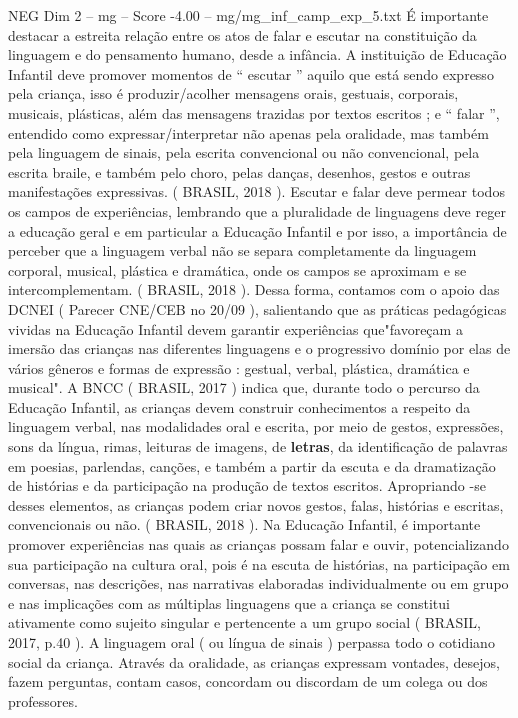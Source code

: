 \begin{textsample}{NEG Dim 2 – mg – Score -4.00 – mg/mg\_inf\_camp\_exp\_5.txt}
É importante destacar a estreita relação entre os atos de falar e escutar na constituição da linguagem e do pensamento humano, desde a infância.
A instituição de Educação Infantil deve promover momentos de “ escutar ” aquilo que está sendo expresso pela criança, isso é produzir/acolher mensagens orais, gestuais, corporais, musicais, plásticas, além das mensagens trazidas por textos escritos ; e “ falar ”, entendido como expressar/interpretar não apenas pela oralidade, mas também pela linguagem de sinais, pela escrita convencional ou não convencional, pela escrita braile, e também pelo choro, pelas danças, desenhos, gestos e outras manifestações expressivas. ( BRASIL, 2018 ).
Escutar e falar deve permear todos os campos de experiências, lembrando que a pluralidade de linguagens deve reger a educação geral e em particular a Educação Infantil e por isso, a importância de perceber que a linguagem verbal não se separa completamente da linguagem corporal, musical, plástica e dramática, onde os campos se aproximam e se intercomplementam. ( BRASIL, 2018 ).
Dessa forma, contamos com o apoio das DCNEI ( Parecer CNE/CEB no 20/09 ), salientando que as práticas pedagógicas vividas na Educação Infantil devem garantir experiências que"favoreçam a imersão das crianças nas diferentes linguagens e o progressivo domínio por elas de vários gêneros e formas de expressão : gestual, verbal, plástica, dramática e musical".
A BNCC ( BRASIL, 2017 ) indica que, durante todo o percurso da Educação Infantil, as crianças devem construir conhecimentos a respeito da linguagem verbal, nas modalidades oral e escrita, por meio de gestos, expressões, sons da língua, rimas, leituras de imagens, de \textbf{letras}, da identificação de palavras em poesias, parlendas, canções, e também a partir da escuta e da dramatização de histórias e da participação na produção de textos escritos.
Apropriando -se desses elementos, as crianças podem criar novos gestos, falas, histórias e escritas, convencionais ou não. ( BRASIL, 2018 ).
Na Educação Infantil, é importante promover experiências nas quais as crianças possam falar e ouvir, potencializando sua participação na cultura oral, pois é na escuta de histórias, na participação em conversas, nas descrições, nas narrativas elaboradas individualmente ou em grupo e nas implicações com as múltiplas linguagens que a criança se constitui ativamente como sujeito singular e pertencente a um grupo social ( BRASIL, 2017, p.40 ).
A linguagem oral ( ou língua de sinais ) perpassa todo o cotidiano social da criança.
Através da oralidade, as crianças expressam vontades, desejos, fazem perguntas, contam casos, concordam ou discordam de um colega ou dos professores.

\end{textsample}
